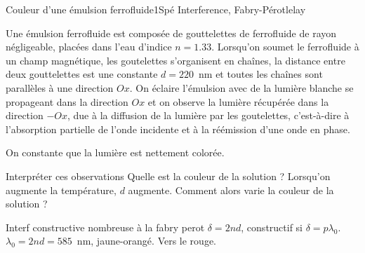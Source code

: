 \begin{exercise}{Couleur d'une émulsion ferrofluide}{1}{Spé}
{Interference, Fabry-Pérot}{lelay}

Une émulsion ferrofluide est composée de gouttelettes de ferrofluide de rayon négligeable, placées dans l'eau d'indice $n = 1.33$. Lorsqu'on soumet le ferrofluide à un champ magnétique, les goutelettes s'organisent en chaînes, la distance entre deux gouttelettes est une constante $d = 220$~nm et toutes les chaînes sont parallèles à une direction $Ox$. On éclaire l'émulsion avec de la lumière blanche se propageant dans la direction $Ox$ et on observe la lumière récupérée dans la direction $-Ox$, due à la diffusion de la lumière par les goutelettes, c'est-à-dire à l'absorption partielle de l'onde incidente et à la réémission d'une onde en phase.

On constante que la lumière est nettement colorée. 

\begin{questions}
    \question Interpréter ces observations
    \question Quelle est la couleur de la solution ?
    \question Lorsqu'on augmente la température, $d$ augmente. Comment alors varie la couleur de la solution ?
\end{questions}

\end{exercise}


\begin{solution}

\begin{questions}
    \question Interf constructive nombreuse à la fabry perot
    \question $\delta = 2nd$, constructif si $\delta = p\lambda_0$. $\lambda_0 = 2nd = 585$~nm, jaune-orangé.
    \question Vers le rouge.
\end{questions}
\end{solution}